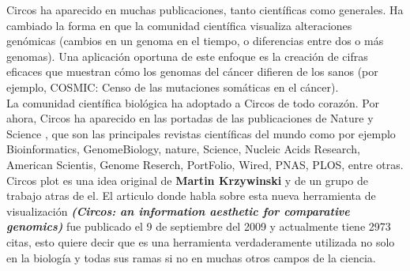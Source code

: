 \documentclass[12pt,letterpaper]{article}
\begin{document}
Circos ha aparecido en muchas publicaciones, tanto científicas como generales. Ha cambiado la forma en que la comunidad científica visualiza alteraciones genómicas (cambios en un genoma en el tiempo, o diferencias entre dos o más genomas). Una aplicación oportuna de este enfoque es la creación de cifras eficaces que muestran cómo los genomas del cáncer difieren de los sanos (por ejemplo, COSMIC: Censo de las mutaciones somáticas en el cáncer). \\

La comunidad científica biológica ha adoptado a Circos de todo corazón. Por ahora, Circos ha aparecido en las portadas de las publicaciones de Nature y Science , que son las principales revistas científicas del mundo como por ejemplo Bioinformatics, GenomeBiology, nature, Science, Nucleic Acids Research, American Scientis, Genome Reserch, PortFolio, Wired, PNAS, PLOS, entre otras.\\

Circos plot es una idea original de \textbf{Martin Krzywinski} y de un grupo de trabajo atras de el. El articulo donde habla sobre esta nueva herramienta de visualizaci\'{o}n \emph{\textbf{(Circos: an information aesthetic for comparative genomics)}} fue publicado el 9 de septiembre del 2009 y actualmente tiene 2973 citas, esto quiere decir que es una herramienta verdaderamente utilizada no solo en la biolog\'{i}a y todas sus ramas si no en muchas otros campos de la ciencia.\\
\end{document}
